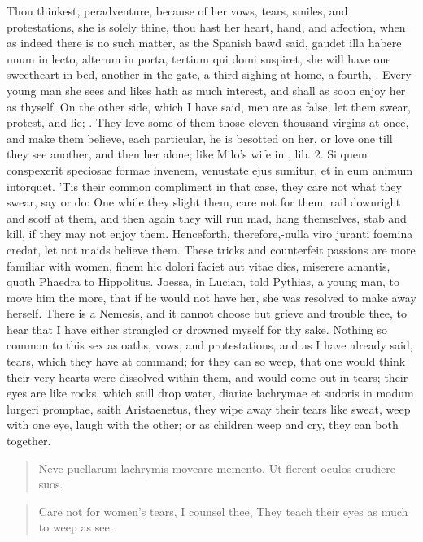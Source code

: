 Thou thinkest, peradventure, because of her vows, tears, smiles, and
protestations, she is solely thine, thou hast her heart, hand, and
affection, when as indeed there is no such matter, as the Spanish
bawd said, gaudet illa habere unum in lecto, alterum in porta, tertium
qui domi suspiret, she will have one sweetheart in bed, another in the
gate, a third sighing at home, a fourth, \etc{}. Every young man she sees
and likes hath as much interest, and shall as soon enjoy her as
thyself. On the other side, which I have said, men are as false, let
them swear, protest, and lie; . They love some of them those eleven thousand virgins at once,
and make them believe, each particular, he is besotted on her, or love
one till they see another, and then her alone; like Milo's wife in
\Apuleius, lib. 2. Si quem conspexerit speciosae formae invenem,
venustate ejus sumitur, et in eum animum intorquet. 'Tis their common
compliment in that case, they care not what they swear, say or do: One
while they slight them, care not for them, rail downright and scoff at
them, and then again they will run mad, hang themselves, stab and kill,
if they may not enjoy them. Henceforth, therefore,-nulla viro juranti
foemina credat, let not maids believe them. These tricks and
counterfeit passions are more familiar with women, finem hic
dolori faciet aut vitae dies, miserere amantis, quoth Phaedra to
Hippolitus. Joessa, in Lucian, told Pythias, a young man, to move
him the more, that if he would not have her, she was resolved to make
away herself. There is a Nemesis, and it cannot choose but grieve and
trouble thee, to hear that I have either strangled or drowned myself
for thy sake. Nothing so common to this sex as oaths, vows, and
protestations, and as I have already said, tears, which they have at
command; for they can so weep, that one would think their very hearts
were dissolved within them, and would come out in tears; their eyes are
like rocks, which still drop water, diariae lachrymae et sudoris in
modum lurgeri promptae, saith  Aristaenetus, they wipe away their
tears like sweat, weep with one eye, laugh with the other; or as
children weep and cry, they can both together.

\begin{latin}
\begin{verse}
Neve puellarum lachrymis moveare memento,
Ut flerent oculos erudiere suos.
\end{verse}
\end{latin}
\translationrule%
\begin{verse}%
Care not for women's tears, I counsel thee,
They teach their eyes as much to weep as see.
\end{verse}%

